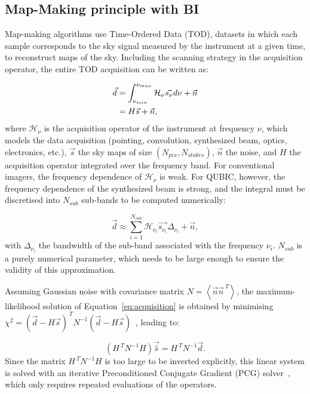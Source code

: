 \documentclass[a4paper,11pt]{article}
\begin{document}
\subsection{Map-Making principle with BI}
\label{sec:mapmaking_principle}

Map-making algorithms use Time-Ordered Data (TOD), datasets in which each sample corresponds to the sky signal measured by the instrument at a given time, to reconstruct maps of the sky. Including the scanning strategy in the acquisition operator, the entire TOD acquisition can be written as:

\begin{align} \label{eq:acquisition}
    \vec{d}
    &= \int_{\nu_{min}}^{\nu_{max}} \mathcal{H}_\nu  \vec{s_\nu} d\nu + \vec{n} \notag \\
    &= H\vec{s} + \vec{n},
\end{align}
where $\mathcal{H}_\nu$ is the acquisition operator of the instrument at frequency $\nu$, which models the data acquisition (pointing, convolution, synthesized beam, optics, electronics, etc.), $\vec{s}$ the sky maps of size $\left(N_{pix}, N_{stokes}\right)$, $\vec{n}$ the noise, and $H$ the acquisition operator integrated over the frequency band. For conventional imagers, the frequency dependence of $\mathcal{H}_\nu$ is weak. For QUBIC, however, the frequency dependence of the synthesized beam is strong, and the integral must be discretised into $N_{sub}$ sub-bands to be computed numerically:

\begin{equation} \label{eq:nsub_acq}
    \vec{d} \approx \sum_{i = 1}^{N_{sub}} \mathcal{H}_{\nu_i} \vec{s_{\nu_i}}\Delta_{\nu_i} + \vec{n},
\end{equation}
with $\Delta_{\nu_i}$ the bandwidth of the sub-band associated with the frequency $\nu_i$. $N_{sub}$ is a purely numerical parameter, which needs to be large enough to ensure the validity of this approximation.

Assuming Gaussian noise with covariance matrix $N=\left\langle\vec{n}\vec{n}^{~T}\right\rangle$, the maximum-likelihood solution of Equation~\ref{eq:acquisition} is obtained by minimising $\chi^2 = (\vec{d} - H\vec{s})^{~T} N^{-1}(\vec{d} - H\vec{s})$~\cite{wright1996}, leading to:

\begin{equation} \label{eq:mapmaking}
    (H^{~T}N^{-1}H)\vec{\hat{s}} = H^{~T} N^{-1} \vec{d}.
\end{equation}
Since the matrix $H^{~T}N^{-1}H$ is too large to be inverted explicitly, this linear system is solved with an iterative Preconditioned Conjugate Gradient (PCG) solver~\cite{shewchuk1994}, which only requires repeated evaluations of the operators.
\end{document}
